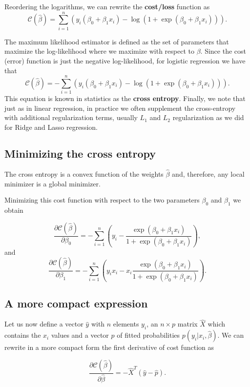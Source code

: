 \documentclass[%
oneside,                 %
final,                   %
10pt]{article}
\begin{document}
Reordering the logarithms, we can rewrite the \textbf{cost/loss} function as
\[
\mathcal{C}(\hat{\beta}) = \sum_{i=1}^n  \left(y_i(\beta_0+\beta_1x_i) -\log{(1+\exp{(\beta_0+\beta_1x_i)})}\right).
\]

The maximum likelihood estimator is defined as the set of parameters that maximize the log-likelihood where we maximize with respect to $\beta$.
Since the cost (error) function is just the negative log-likelihood, for logistic regression we have that
\[
\mathcal{C}(\hat{\beta})=-\sum_{i=1}^n  \left(y_i(\beta_0+\beta_1x_i) -\log{(1+\exp{(\beta_0+\beta_1x_i)})}\right).
\]
This equation is known in statistics as the \textbf{cross entropy}. Finally, we note that just as in linear regression, 
in practice we often supplement the cross-entropy with additional regularization terms, usually $L_1$ and $L_2$ regularization as we did for Ridge and Lasso regression.

\subsection*{Minimizing the cross entropy}

The cross entropy is a convex function of the weights $\hat{\beta}$ and,
therefore, any local minimizer is a global minimizer. 


Minimizing this
cost function with respect to the two parameters $\beta_0$ and $\beta_1$ we obtain

\[
\frac{\partial \mathcal{C}(\hat{\beta})}{\partial \beta_0} = -\sum_{i=1}^n  \left(y_i -\frac{\exp{(\beta_0+\beta_1x_i)}}{1+\exp{(\beta_0+\beta_1x_i)}}\right),
\]
and 
\[
\frac{\partial \mathcal{C}(\hat{\beta})}{\partial \beta_1} = -\sum_{i=1}^n  \left(y_ix_i -x_i\frac{\exp{(\beta_0+\beta_1x_i)}}{1+\exp{(\beta_0+\beta_1x_i)}}\right).
\]

\subsection*{A more compact expression}

Let us now define a vector $\hat{y}$ with $n$ elements $y_i$, an
$n\times p$ matrix $\hat{X}$ which contains the $x_i$ values and a
vector $\hat{p}$ of fitted probabilities $p(y_i\vert x_i,\hat{\beta})$. We can rewrite in a more compact form the first
derivative of cost function as

\[
\frac{\partial \mathcal{C}(\hat{\beta})}{\partial \hat{\beta}} = -\hat{X}^T\left(\hat{y}-\hat{p}\right). 
\]
\end{document}
